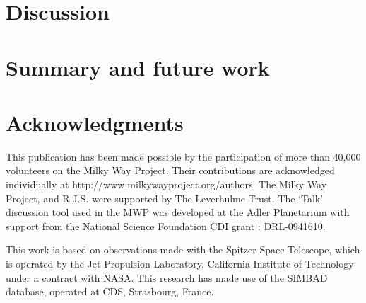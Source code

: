 \documentclass[times,usenatbib]{mn2e}
\begin{document}
\section{Discussion}

\section{Summary and future work}

\section*{Acknowledgments}

This publication has been made possible by the participation of more than 40,000 volunteers on the Milky Way Project. Their contributions are acknowledged individually at http://www.milkywayproject.org/authors. The Milky Way Project, and R.J.S. were supported by The Leverhulme Trust. The `Talk' discussion tool used in the MWP was developed at the Adler Planetarium with support from the National Science Foundation CDI grant : DRL-0941610. 

This work is based on observations made with the Spitzer Space Telescope, which is operated by the Jet Propulsion Laboratory, California Institute of Technology under a contract with NASA. This research has made use of the SIMBAD database, operated at CDS, Strasbourg, France.




\clearpage

\end{document}
